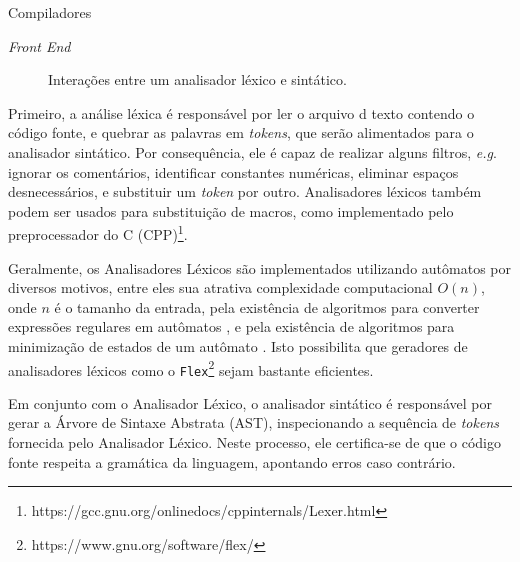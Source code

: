 \begin{section}{Compiladores}
\begin{subsection}{\textit{Front End}}
\begin{figure}
\begin{center}
{
}
\end{center}

\caption{Interações entre um analisador léxico e sintático.}
\label{fig:lexico_sintatico}
\end{figure}

    Primeiro, a análise léxica é responsável por ler o arquivo
d texto contendo o código fonte, e quebrar as palavras em \textit{tokens}, que
serão alimentados para o analisador sintático. Por consequência, ele é capaz de
realizar alguns filtros, \textit{e.g}. ignorar os comentários, identificar constantes
numéricas, eliminar espaços desnecessários, e substituir um \textit{token} por
outro.
Analisadores léxicos também podem ser usados para substituição
de macros, como implementado pelo preprocessador do C
(CPP)\footnote{https://gcc.gnu.org/onlinedocs/cppinternals/Lexer.html}.

Geralmente, os Analisadores Léxicos são implementados utilizando autômatos
por diversos motivos, entre eles sua atrativa complexidade computacional
$O(n)$, onde $n$ é o tamanho da entrada, pela existência de algoritmos
para converter expressões regulares em autômatos \citep{thompson}, e pela
existência de algoritmos para minimização de estados de um autômato
\citep{hopcroft1971n}. Isto possibilita que geradores de analisadores léxicos
como o \texttt{Flex}\footnote{https://www.gnu.org/software/flex/}
sejam bastante eficientes.

    Em conjunto com o Analisador Léxico, o analisador sintático é
responsável por gerar a Árvore de Sintaxe Abstrata (AST), inspecionando a
sequência de \textit{tokens} fornecida pelo Analisador Léxico. Neste processo,
ele certifica-se de que o código fonte respeita a gramática da linguagem,
apontando erros caso contrário.


\end{subsection}
\end{section}
